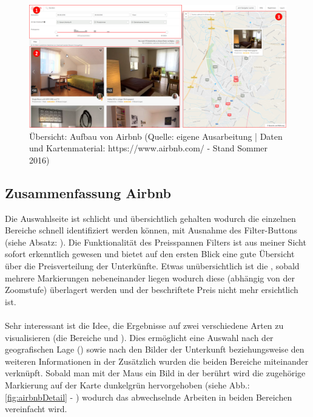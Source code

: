 \documentclass[../Bachelorarbeit.tex]{subfiles}
\begin{document}
\begin{figure}[H]
	\centering
	\includegraphics[width=1\linewidth]{img/StandDerTechnik/airbnbOverview}
	\caption[Übersicht: Aufbau von Airbnb]{Übersicht: Aufbau von Airbnb (Quelle: eigene Ausarbeitung | Daten und Kartenmaterial: https://www.airbnb.com/ - Stand Sommer 2016)}
	\label{fig:airbnbOverview}
\end{figure}

\subsection{Zusammenfassung Airbnb}
\label{airbnb:review}
Die Auswahlseite ist schlicht und übersichtlich gehalten wodurch die einzelnen Bereiche schnell identifiziert werden können, mit Ausnahme des Filter-Buttons (siehe Absatz: ). 
Die Funktionalität des Preisspannen Filters ist aus meiner Sicht sofort erkenntlich gewesen und bietet auf den ersten Blick eine gute Übersicht über die Preisverteilung der Unterkünfte.
Etwas unübersichtlich ist die , sobald mehrere Markierungen nebeneinander liegen wodurch diese (abhängig von der Zoomstufe) überlagert werden und der beschriftete Preis nicht mehr ersichtlich ist. \\
\\
Sehr interessant ist die Idee, die Ergebnisse auf zwei verschiedene Arten zu visualisieren (die Bereiche  und ).
Dies ermöglicht eine Auswahl nach der geografischen Lage () sowie nach den Bilder der Unterkunft beziehungsweise den weiteren Informationen in der 
Zusätzlich wurden die beiden Bereiche miteinander verknüpft. 
Sobald man mit der Maus ein Bild in der  berührt wird die zugehörige Markierung auf der Karte dunkelgrün hervorgehoben (siehe Abb.: \ref*{fig:airbnbDetail} - ) wodurch das abwechselnde Arbeiten in beiden Bereichen vereinfacht wird.
\end{document}
